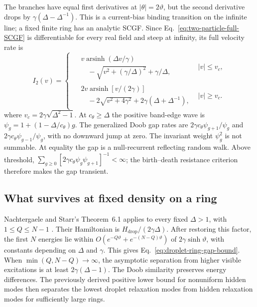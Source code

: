 \documentclass[aps,pre,reprint,amsmath,amssymb,longbibliography,floatfix]{revtex4-2}
\begin{document}
The branches have equal first derivatives at $|\theta|=2\vartheta$,
but the second derivative drops by $\gamma(\Delta-\Delta^{-1})$.
This is a current-bias binding transition on the infinite line; a fixed
finite ring has an analytic SCGF. Since Eq.~\eqref{eq:two-particle-full-SCGF}
is differentiable for every real field and steep at infinity, its full
velocity rate is
\begin{equation}
 I_2(v)=\begin{cases}
 \begin{aligned}
 &v\operatorname{arsinh}(\Delta v/\gamma)\\
 &\quad-\sqrt{v^2+(\gamma/\Delta)^2}+\gamma/\Delta,
 \end{aligned}&|v|\le v_c,\\[6pt]
 \begin{aligned}
 &2v\operatorname{arsinh}\left[v/(2\gamma)\right]\\
 &\quad-2\sqrt{v^2+4\gamma^2}+2\gamma(\Delta+\Delta^{-1}),
 \end{aligned}&|v|\ge v_c.
 \end{cases}\label{eq:two-particle-full-rate}
\end{equation}
where $v_c=2\gamma\sqrt{\Delta^2-1}$.
At $c_\theta\ge\Delta$ the positive band-edge wave is
$\psi_g=1+(1-\Delta/c_\theta)g$. The generalized Doob gap rates are
$2\gamma c_\theta\psi_{g+1}/\psi_g$ and
$2\gamma c_\theta\psi_{g-1}/\psi_g$, with no downward jump at zero.
The invariant weight $\psi_g^2$ is not summable. At equality the gap is
a null-recurrent reflecting random walk. Above threshold,
$\sum_{g\ge0}\left[2\gamma c_\theta\psi_g\psi_{g+1}\right]^{-1}<\infty$;
the birth--death resistance criterion therefore makes the gap transient.

\subsection{What survives at fixed density on a ring}

Nachtergaele and Starr's Theorem~6.1 applies to every fixed
$\Delta>1$, with $1\le Q\le N-1$
\cite{NachtergaeleStarr2001}. Their Hamiltonian is
$H_{\mathrm{drop}}/(2\gamma\Delta)$. After restoring this factor, the
first $N$ energies lie within
$O(e^{-Q\vartheta}+e^{-(N-Q)\vartheta})$ of
$2\gamma\sinh\vartheta$, with constants depending on $\Delta$ and
$\gamma$. This gives Eq.~\eqref{eq:droplet-ring-gap-bound}. When
$\min(Q,N-Q)\to\infty$, the asymptotic separation from higher visible
excitations is at least $2\gamma(\Delta-1)$. The Doob similarity preserves
energy differences. The previously derived positive lower bound for
nonuniform hidden modes then separates the lowest droplet relaxation
modes from hidden relaxation modes for sufficiently large rings.
\end{document}
